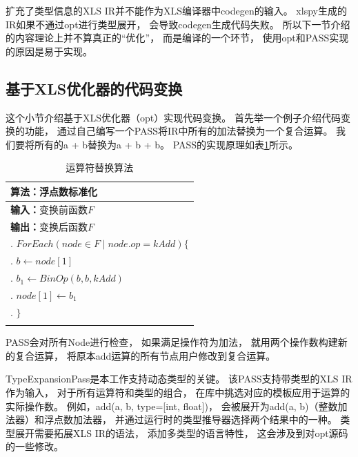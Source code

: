 扩充了类型信息的XLS IR并不能作为XLS编译器中codegen的输入。
xlspy生成的IR如果不通过opt进行类型展开，
会导致codegen生成代码失败。
所以下一节介绍的内容理论上并不算真正的“优化”，
而是编译的一个环节，
使用opt和PASS实现的原因是易于实现。

\subsection{基于XLS优化器的代码变换}

这个小节介绍基于XLS优化器（opt）实现代码变换。
首先举一个例子介绍代码变换的功能，
通过自己编写一个PASS将IR中所有的加法替换为一个复合运算。
我们要将所有的a + b替换为a + b + b。
PASS的实现原理如表\ref{alg.opreplace}所示。

\begin{table}
\begin{flushleft}
    \caption{运算符替换算法}
    \label{alg.opreplace}
    \begin{tabular*}{\hsize}{@{}@{\extracolsep{\fill}}l@{}}
        \Xhline{3\arrayrulewidth}
        \;\textbf{算法：}浮点数标准化 \\
        \hline

        \;\textbf{输入：}$\text{变换前函数}F$ \\
        \;\textbf{输出：}$\text{变换后函数}F$ \\
        \;1. $ForEach(node \in F \mid node.op = kAdd) \{$ \\
        \;2. \quad$b \gets node[1]$ \\
        \;3. \quad$b_1 \gets BinOp(b, b, kAdd)$ \\
        \;4. \quad$node[1] \gets b_1$ \\
        \;5. $\}$ \\

        \Xhline{3\arrayrulewidth}
    \end{tabular*}
\end{flushleft}
\end{table}

PASS会对所有Node进行检查，
如果满足操作符为加法，
就用两个操作数构建新的复合运算，
将原本add运算的所有节点用户修改到复合运算。

TypeExpansionPass是本工作支持动态类型的关键。
该PASS支持带类型的XLS IR作为输入，
对于所有运算符和类型的组合，
在库中挑选对应的模板应用于运算的实际操作数。
例如，add(a, b, type=[int, float])，
会被展开为add(a, b)（整数加法器）和浮点数加法器，
并通过运行时的类型推导器选择两个结果中的一种。
类型展开需要拓展XLS IR的语法，
添加多类型的语言特性，
这会涉及到对opt源码的一些修改。

